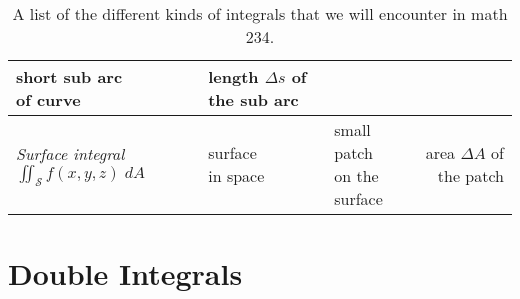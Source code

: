 \begin{table}[t]
\begin{tabular}{lllr}
    \parbox{9em}{\centering short sub arc\\of curve}  &   
    \parbox{9em}{\centering length $\Delta s$ of\\the sub arc}\\[2ex]\midrule
    \rule{0pt}{16pt}%
    \parbox{9em}{\centering \itshape Surface integral\\
      $\iint_{\mathcal{S}} f(x, y, z)\; dA $}  & 
    \parbox{7em}{\centering surface\\in space}  &  
    \parbox{9em}{\centering small patch\\on the surface}  &   
    \parbox{9em}{\centering area $\Delta A$ of\\the patch}\\[2ex]\bottomrule
  \end{tabular}
  \smallskip

  \caption{A list of the different kinds of integrals that we will
    encounter in math 234.}
  \label{tab:kindsofintegrals}

\end{table} %


\section{Double Integrals}  

